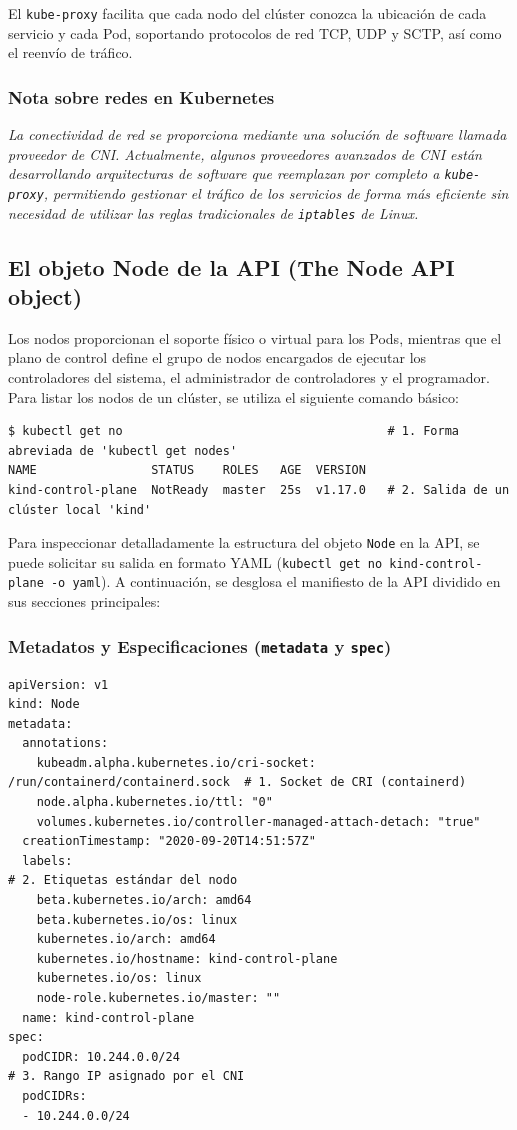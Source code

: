 El \texttt{kube-proxy} facilita que cada nodo del clúster conozca la ubicación de cada servicio y cada Pod, soportando protocolos de red TCP, UDP y SCTP, así como el reenvío de tráfico.

\subsubsection*{Nota sobre redes en Kubernetes}
\textit{La conectividad de red se proporciona mediante una solución de software llamada proveedor de CNI. Actualmente, algunos proveedores avanzados de CNI están desarrollando arquitecturas de software que reemplazan por completo a \texttt{kube-proxy}, permitiendo gestionar el tráfico de los servicios de forma más eficiente sin necesidad de utilizar las reglas tradicionales de \texttt{iptables} de Linux.}

\subsection{El objeto Node de la API (The Node API object)}

Los nodos proporcionan el soporte físico o virtual para los Pods, mientras que el plano de control define el grupo de nodos encargados de ejecutar los controladores del sistema, el administrador de controladores y el programador. Para listar los nodos de un clúster, se utiliza el siguiente comando básico:

\begin{verbatim}
$ kubectl get no                                     # 1. Forma abreviada de 'kubectl get nodes'
NAME                STATUS    ROLES   AGE  VERSION
kind-control-plane  NotReady  master  25s  v1.17.0   # 2. Salida de un clúster local 'kind'
\end{verbatim}

Para inspeccionar detalladamente la estructura del objeto \texttt{Node} en la API, se puede solicitar su salida en formato YAML (\texttt{kubectl get no kind-control-plane -o yaml}). A continuación, se desglosa el manifiesto de la API dividido en sus secciones principales:

\subsubsection{Metadatos y Especificaciones (\texttt{metadata} y \texttt{spec})}
\begin{verbatim}
apiVersion: v1
kind: Node
metadata:
  annotations:
    kubeadm.alpha.kubernetes.io/cri-socket: /run/containerd/containerd.sock  # 1. Socket de CRI (containerd)
    node.alpha.kubernetes.io/ttl: "0"
    volumes.kubernetes.io/controller-managed-attach-detach: "true"
  creationTimestamp: "2020-09-20T14:51:57Z"
  labels:                                                                    # 2. Etiquetas estándar del nodo
    beta.kubernetes.io/arch: amd64
    beta.kubernetes.io/os: linux
    kubernetes.io/arch: amd64
    kubernetes.io/hostname: kind-control-plane
    kubernetes.io/os: linux
    node-role.kubernetes.io/master: ""
  name: kind-control-plane
spec:
  podCIDR: 10.244.0.0/24                                                     # 3. Rango IP asignado por el CNI
  podCIDRs:
  - 10.244.0.0/24
\end{verbatim}

